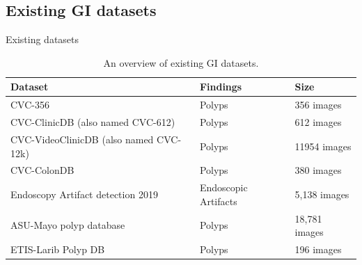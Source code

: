 \documentclass{libs/ufc_format}
\begin{document}
\subsection{Existing GI datasets}
\begin{frame}{Existing datasets}
  \begin{table}
\caption{An overview of existing GI datasets.}
\begin{adjustbox}{width=\textwidth}
\begin{tabular}{|l|l|l|}
\hline
\rowcolor[HTML]{FFFFFF} 
\textbf{Dataset}                                     & \textbf{Findings}                                                                                        & \textbf{Size}                     \\ \hline
CVC-356 \cite{Bernal2012TowardsAP}                                             & Polyps                                                                                                   & 356 images                       \\ \hline
CVC-ClinicDB (also named CVC-612) \cite{Bernal2015WMDOVAMF}                    & Polyps                                                                                                   & 612 images                      \\ \hline
CVC-VideoClinicDB (also named CVC-12k) \cite{Bernal2012TowardsAP}              & Polyps                                                                                                   & 11954 images                    \\ \hline
CVC-ColonDB \cite{Bernal2012TowardsAP}                                       & Polyps                                                                                                   & 380 images                      \\ \hline
Endoscopy Artifact detection 2019 \cite{Ali2019EndoscopyAD}                   & Endoscopic Artifacts                                                                                     & 5,138 images                      \\ \hline
ASU-Mayo polyp database  \cite{Tajbakhsh2016AutomatedPD}                            & Polyps                                                                                                   & 18,781 images                   \\ \hline
ETIS-Larib Polyp DB \cite{Silva2013TowardED}                                & Polyps                                                                                                   & 196 images                      \\ \hline

\end{tabular}
\end{adjustbox}
\end{table}
\end{frame}
\end{document}
